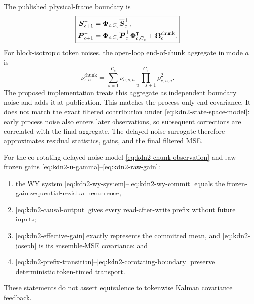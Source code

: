 \documentclass[11pt,letterpaper,logo]{yalearxiv}
\begin{document}
The published physical-frame boundary is
\begin{equation}
\boxed{
\begin{aligned}
  \boldsymbol{S}_{c+1}^-
  &=
  \boldsymbol{\Phi}_{c,C_c}\overline{\boldsymbol{S}}_c^+,
  \\
  \boldsymbol{P}_{c+1}^-
  &=
  \boldsymbol{\Phi}_{c,C_c}\overline{\boldsymbol{P}}_c^+
  \boldsymbol{\Phi}_{c,C_c}^{\intercal}
  +
  \boldsymbol{\Omega}_c^{\mathrm{chunk}}.
\end{aligned}}
\label{eq:kdn2-corotating-boundary}
\end{equation}
For block-isotropic token noises, the open-loop end-of-chunk aggregate in mode $a$ is
\begin{equation}
  \nu_{c,a}^{\mathrm{chunk}}
  =
  \sum_{s=1}^{C_c}
  \nu_{c,s,a}
  \prod_{u=s+1}^{C_c}\rho_{c,u,a}^{2}.
  \label{eq:kdn2-aggregate-noise}
\end{equation}
The proposed implementation treats this aggregate as independent boundary noise and adds it at
publication. This matches the process-only end covariance. It does not match the exact filtered
contribution under \eqref{eq:kdn2-state-space-model}: early process noise also enters later
observations, so subsequent corrections are correlated with the final aggregate. The delayed-noise
surrogate therefore approximates residual statistics, gains, and the final filtered MSE.

\label{prop:kdn2-chunk-update}
\begin{tcolorbox}[
  title={Proposition~\thedefinition: Causal Chunkwise Implementation},
  colback=blue!7,
  colbacktitle=blue!22,
  colframe=blue!45!black,
  coltitle=black,
  fonttitle=\bfseries,
  boxrule=0.4pt,
  arc=1pt,
  left=5pt,
  right=5pt,
  top=5pt,
  bottom=5pt
]
For the co-rotating delayed-noise model \eqref{eq:kdn2-chunk-observation} and raw frozen gains
\eqref{eq:kdn2-u-gamma}--\eqref{eq:kdn2-raw-gain}:
\begin{enumerate}[leftmargin=1.5em,itemsep=2pt,topsep=2pt]
  \item the WY system \eqref{eq:kdn2-wy-system}--\eqref{eq:kdn2-wy-commit} equals the
  frozen-gain sequential-residual recurrence;
  \item \eqref{eq:kdn2-causal-output} gives every read-after-write prefix without future inputs;
  \item \eqref{eq:kdn2-effective-gain} exactly represents the committed mean, and
  \eqref{eq:kdn2-joseph} is its ensemble-MSE covariance; and
  \item \eqref{eq:kdn2-prefix-transition}--\eqref{eq:kdn2-corotating-boundary} preserve
  deterministic token-timed transport.
\end{enumerate}
These statements do not assert equivalence to tokenwise Kalman covariance feedback.
\end{tcolorbox}
\end{document}
